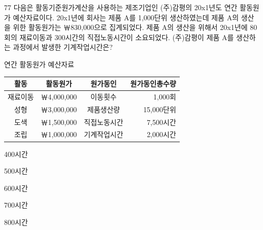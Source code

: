 \begin{question}{77}
다음은 활동기준원가계산을 사용하는 제조기업인 (주)감평의 20x1년도 연간 활동원가 예산자료이다. 20x1년에 회사는 제품 A를 1,000단위 생산하였는데 제품 A의 생산을 위한 활동원가는 ￦830,000으로 집계되었다. 제품 A의 생산을 위해서 20x1년에 80회의 재료이동과 300시간의 직접노동시간이 소요되었다. (주)감평이 제품 A를 생산하는 과정에서 발생한 기계작업시간은?
\begin{framedtext}
연간 활동원가 예산자료 \par
\begin{center}
\small
\begin{tabular}{|c|c|c|r|}
\hline
활동 & 활동원가 & 원가동인 & \multicolumn{1}{c|}{원가동인총수량} \\ \hline
재료이동 & ￦4,000,000 & 이동횟수 & 1,000회 \\ \hline
성형 & ￦3,000,000 & 제품생산량 & 15,000단위 \\ \hline
도색 & ￦1,500,000 & 직접노동시간 & 7,500시간 \\ \hline
조립 & ￦1,000,000 & 기계작업시간 & 2,000시간 \\ \hline
\end{tabular}
\end{center}
\end{framedtext}
\begin{choices}
  \item 400시간
  \item 500시간
  \item 600시간
  \item 700시간
  \item 800시간
\end{choices}
\end{question}
